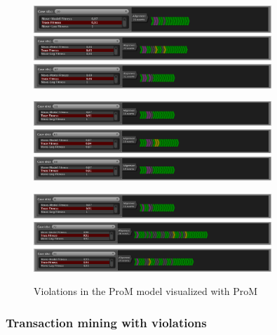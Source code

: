 \begin{figure}[H]
\centering
\includegraphics[width=0.8\textwidth]{figures/violation_case/10-prom.png}
\includegraphics[width=0.8\textwidth]{figures/violation_case/20-prom.png}
\includegraphics[width=0.8\textwidth]{figures/violation_case/47-prom.png}

\includegraphics[width=0.8\textwidth]{figures/violation_case/53-prom.png}
\includegraphics[width=0.8\textwidth]{figures/violation_case/63-prom.png}
\includegraphics[width=0.8\textwidth]{figures/violation_case/88-prom.png}

\includegraphics[width=0.8\textwidth]{figures/violation_case/6-prom.png}
\includegraphics[width=0.8\textwidth]{figures/violation_case/72-prom.png}
\includegraphics[width=0.8\textwidth]{figures/violation_case/81-prom.png}
\caption{Violations in the ProM model visualized with ProM}
\label{fig:violations_prom}
\end{figure}

\subsubsection{Transaction mining with violations}

